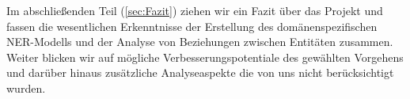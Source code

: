 Im abschließenden Teil (\ref{sec:Fazit}) ziehen wir ein Fazit über das Projekt und fassen die wesentlichen Erkenntnisse der Erstellung des domänenspezifischen \ac{NER}-Modells und der Analyse von Beziehungen zwischen Entitäten zusammen. Weiter blicken wir auf mögliche Verbesserungspotentiale des gewählten Vorgehens und darüber hinaus zusätzliche Analyseaspekte die von uns nicht berücksichtigt wurden.

